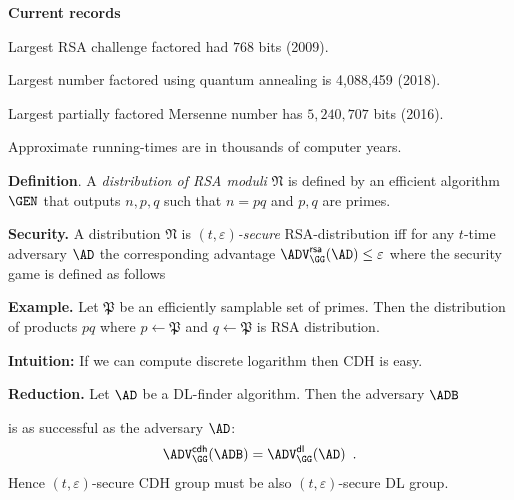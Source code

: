 \documentclass[landscape,footrule]{foils}
\newcommand{\lastline}{\vspace*{-2ex}}
\begin{document}
\textbf{Current records}
\begin{triangles}
  \item Largest RSA challenge factored had $768$ bits (2009).
  \item Largest number factored using quantum annealing is 4,088,459 (2018). 
  \item Largest partially factored Mersenne number has $5,240,707$ bits (2016).
  \item Approximate running-times are in thousands of computer years.
\end{triangles}


\textbf{Definition}. A \emph{distribution of RSA moduli} $\mathfrak{N}$ is
defined by an efficient algorithm $\GEN$ that outputs $n,p,q$ such
that $n=pq$ and $p,q$ are primes.
\bigskip

\textbf{Security.} A distribution $\mathfrak{N}$ is
\emph{$(t,\varepsilon)$-secure} RSA-distribution iff for any $t$-time
adversary $\AD$ the corresponding advantage
$\advRSAXX{\GG}{\AD}\leq\varepsilon$ where the security game is
defined as follows
 

\textbf{Example.}  Let $\mathfrak{P}$ be an efficiently samplable set
of primes. Then the distribution of products $pq$ where
$p\gets\mathfrak{P}$ and $q\gets\mathfrak{P}$ is RSA distribution. 
\lastline





\textbf{Intuition:} If we can compute discrete logarithm then CDH is easy.


\textbf{Reduction.} Let $\AD$ be a DL-finder algorithm. Then the adversary $\ADB$


is as successful as the adversary $\AD$:
\begin{align*}
  \advCDHXX{\GG}{\ADB}=\advDLXX{\GG}{\AD}\enspace.
\end{align*}
Hence $(t,\varepsilon)$-secure CDH group must be also $(t,\varepsilon)$-secure DL group.
\lastline

\end{document}
